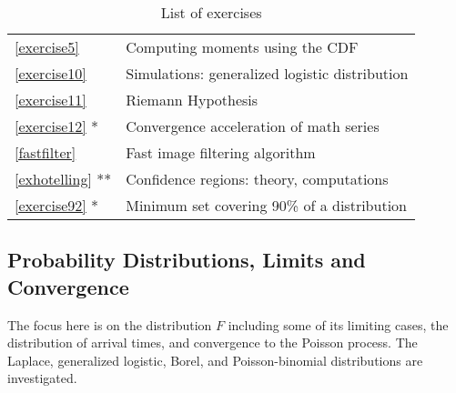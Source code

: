 \documentclass[10pt]{article}
\begin{document}
\begin{table}[H]
\begin{minipage}{.5\linewidth}
\begin{tabular}{ll}
   \ref{exercise5} & Computing moments using the CDF\\
   \ref{exercise10} & Simulations: generalized logistic distribution \\
   \ref{exercise11} & Riemann Hypothesis \\
   \ref{exercise12} * & Convergence acceleration of math series\\
   \ref{fastfilter} & Fast image filtering algorithm  \\
   \ref{exhotelling} ** & Confidence regions: theory, computations \\
   \ref{exercise92} * &  Minimum set covering 90\% of a distribution
        \end{tabular}
    \end{minipage} 
    \caption{\label{tabex21}List of exercises}

\end{table}




\subsection{Probability Distributions, Limits and Convergence}

The focus here is on the distribution $F$ including some of its  limiting cases, the distribution of arrival times, and convergence to the Poisson process. The Laplace, generalized logistic, Borel, and Poisson-binomial distributions are investigated.
\end{document}
